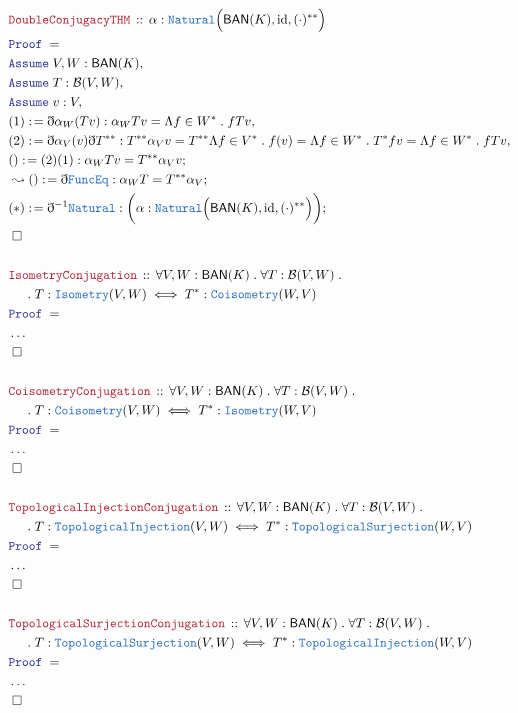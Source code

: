 \documentclass[12pt]{scrartcl}
\newcommand{\TYPE}[1]{\textcolor{NavyBlue}{\mathtt{#1}}}
\newcommand{\LOGIC}[1]{\textcolor{Blue}{\mathtt{#1}}}
\newcommand{\THM}[1]{\textcolor{Maroon}{\mathtt{#1}}}
\renewcommand{\.}{\; . \;}
\newcommand{\de}{: \kern 0.1pc =}
\newcommand{\Theorem}[2]{& \THM{#1} \, :: \, #2 \\ & \Proof = \\ }
\newcommand{\NewLine}{\\ & \kern 1pc}
\newcommand{\Page}[1]{\begin{align*} #1 \end{align*} \newpage   }
\newcommand{ \bd }{ \ByDef }
\newcommand{\NoProof}{ & \ldots \\ \EndProof}
\DeclareMathOperator*{\id}{id}
\newcommand{\Say}[3]{& #1 \de #2 : #3, \\}
\newcommand{\Conclude}[3]{& #1 \de #2 : #3; \\}
\newcommand{\DeriveConclude}[3]{& \leadsto #1 \de #2 : #3 ; \\}
\newcommand{\A}{\LOGIC{Assume} \;}
\newcommand{\Assume}[2]{& \A #1 : #2, \\}
\newcommand{\QED}{\; \square}
\newcommand{\EndProof}{& \QED \\}
\newcommand{\ByDef}{\eth}
\newcommand{\Proof}{\LOGIC{Proof} \; }
\newcommand{\BAN}{\textsf{BAN}}
\newcommand{\B}{\mathcal{B}}
\begin{document}
\Page{
 \Theorem{DoubleConjugacyTHM}{\alpha : \TYPE{Natural}\Big(\BAN(K),{\id}, (\cdot)^{**} \Big)}
 \Assume{V,W}{\BAN(K)}
 \Assume{T}{\B(V,W)}
 \Assume{v}{V}
 \Say{(1)}{\bd \alpha_W(T v)}{\alpha_W T v = \Lambda f \in W^* \. f T v}
 \Say{(2)}{\bd \alpha_V(v) \bd T^{**}}{ T^{**} \alpha_V v = T^{**} \Lambda f \in V^* \. f(v) = \Lambda f \in W^* \. T^* f v =  \Lambda f \in W^* \.  f Tv }
 \Conclude{()}{(2)(1)}{\alpha_W T v =  T^{**} \alpha_V v}
 \DeriveConclude{()}{\bd \TYPE{FuncEq}}{ \alpha_W T = T^{**} \alpha_V}
 \Conclude{(*)}{\bd^{-1}\TYPE{Natural}}{\bigg(\alpha : \TYPE{Natural}\Big(\BAN(K),{\id}, (\cdot)^{**} \Big)\bigg)}
 \EndProof
 \\
 \Theorem{IsometryConjugation}{\forall V,W : \BAN(K) \.
  \forall T : \B(V,W) \. 
  \NewLine \.   
  T : \TYPE{Isometry}(V,W) \iff T^* : \TYPE{Coisometry}(W,V) }
 \NoProof
 \\
  \Theorem{CoisometryConjugation}{\forall V,W : \BAN(K) \. \forall T : \B(V,W) \. 
   \NewLine \.   
  T : \TYPE{Coisometry}(V,W) \iff T^* : \TYPE{Isometry}(W,V) }
 \NoProof
 \\
  \Theorem{TopologicalInjectionConjugation}{\forall V,W : \BAN(K) \. \forall T : \B(V,W) \.  \NewLine \. 
   T : \TYPE{TopologicalInjection}(V,W) \iff T^* : \TYPE{TopologicalSurjection}(W,V) }
 \NoProof
 \\
  \Theorem{TopologicalSurjectionConjugation}{\forall V,W : \BAN(K) \. \forall T : \B(V,W) \. 
   \NewLine \. 
  T : \TYPE{TopologicalSurjection}(V,W) \iff T^* : \TYPE{TopologicalInjection}(W,V) }
 \NoProof
}
\end{document}
